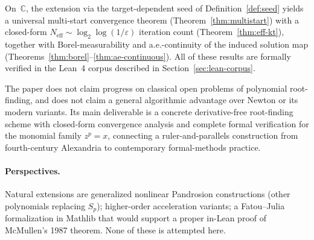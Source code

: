 \documentclass[11pt,a4paper]{article}
\theoremstyle{definition}
\begin{document}
On~$\mathbb{C}$, the extension via the target-dependent seed of Definition~\ref{def:seed} yields a universal multi-start convergence theorem (Theorem~\ref{thm:multistart}) with a closed-form $N_{\mathrm{eff}} \sim \log_2\log(1/\varepsilon)$ iteration count (Theorem~\ref{thm:eff-kt}), together with Borel-measurability and a.e.-continuity of the induced solution map (Theorems~\ref{thm:borel}--\ref{thm:ae-continuous}). All of these results are formally verified in the Lean~4 corpus described in Section~\ref{sec:lean-corpus}.

\medskip

The paper does not claim progress on classical open problems of polynomial root-finding, and does not claim a general algorithmic advantage over Newton or its modern variants. Its main deliverable is a concrete derivative-free root-finding scheme with closed-form convergence analysis and complete formal verification for the monomial family $z^p = x$, connecting a ruler-and-parallels construction from fourth-century Alexandria to contemporary formal-methods practice.

\paragraph{Perspectives.} Natural extensions are generalized nonlinear Pandrosion constructions (other polynomials replacing $S_p$); higher-order acceleration variants; a Fatou--Julia formalization in Mathlib that would support a proper in-Lean proof of McMullen's 1987 theorem. None of these is attempted here.
\end{document}
